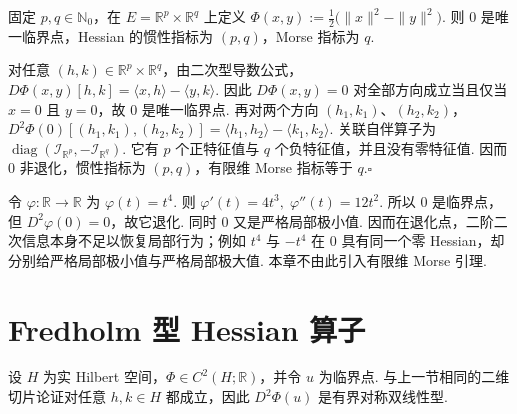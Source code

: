 \begin{FAExample}\label{iii11:finite-morse-model}
固定 \(\displaystyle p,q\in\mathbb N_0\)，在 \(\displaystyle E=\mathbb R^p\times\mathbb R^q\) 上定义
\(\displaystyle \Phi(x,y) := \frac{1}{2}\bigl(\|x\|^2-\|y\|^2\bigr)\).
则 \(\displaystyle0\) 是唯一临界点，Hessian 的惯性指标为 \(\displaystyle(p,q)\)，Morse 指标为 \(\displaystyle q\).
\end{FAExample}

\begin{FAProof}
对任意 \(\displaystyle(h,k)\in\mathbb R^p\times\mathbb R^q\)，由二次型导数公式，
\(\displaystyle D\Phi(x,y)[h,k] = \langle x,h\rangle - \langle y,k\rangle\).
因此 \(\displaystyle D\Phi(x,y)=0\) 对全部方向成立当且仅当 \(\displaystyle x=0\) 且 \(\displaystyle y=0\)，故 \(\displaystyle0\) 是唯一临界点. 再对两个方向 \(\displaystyle(h_1,k_1)\)、\(\displaystyle(h_2,k_2)\)，
\(\displaystyle D^2\Phi(0)[(h_1,k_1),(h_2,k_2)] = \langle h_1,h_2\rangle - \langle k_1,k_2\rangle\).
关联自伴算子为 \(\displaystyle\operatorname{diag}(\mathcal I_{\mathbb R^p},-\mathcal I_{\mathbb R^q})\). 它有 \(\displaystyle p\) 个正特征值与 \(\displaystyle q\) 个负特征值，并且没有零特征值. 因而 \(\displaystyle0\) 非退化，惯性指标为 \(\displaystyle(p,q)\)，有限维 Morse 指标等于 \(\displaystyle q\).\hfill\(\square\)
\end{FAProof}

\begin{FACounterexample}\label{iii11:degenerate-t4}
令 \(\displaystyle\varphi:\mathbb R\to\mathbb R\) 为 \(\displaystyle\varphi(t)=t^4\). 则
\(\displaystyle \varphi'(t)=4t^3, \; \varphi''(t)=12t^2\).
所以 \(\displaystyle0\) 是临界点，但 \(\displaystyle D^2\varphi(0)=0\)，故它退化. 同时 \(\displaystyle0\) 又是严格局部极小值. 因而在退化点，二阶二次信息本身不足以恢复局部行为；例如 \(\displaystyle t^4\) 与 \(\displaystyle-t^4\) 在 \(\displaystyle0\) 具有同一个零 Hessian，却分别给严格局部极小值与严格局部极大值. 本章不由此引入有限维 Morse 引理.
\end{FACounterexample}

\section{Fredholm 型 Hessian 算子}\label{sec:iii11-fredholm-hessian}

设 \(\displaystyle H\) 为实 Hilbert 空间，\(\displaystyle\Phi\in C^2(H;\mathbb R)\)，并令 \(\displaystyle u\) 为临界点. 与上一节相同的二维切片论证对任意 \(\displaystyle h,k\in H\) 都成立，因此 \(\displaystyle D^2\Phi(u)\) 是有界对称双线性型.

